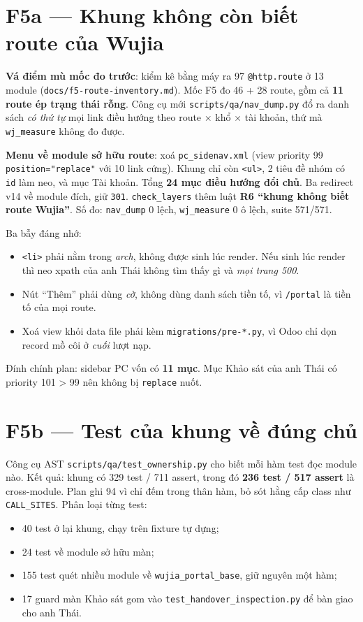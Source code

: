 \section{F5a --- Khung không còn biết route của Wujia}

\textbf{Vá điểm mù mốc đo trước}: kiểm kê bằng máy ra 97 \texttt{@http.route} ở 13 module
(\texttt{docs/f5-route-inventory.md}). Mốc F5 đo 46 + 28 route, gồm cả \textbf{11 route ép trạng thái rỗng}.
Công cụ mới \texttt{scripts/qa/nav\_dump.py} đổ ra danh sách \emph{có thứ tự} mọi link điều hướng theo
route × khổ × tài khoản, thứ mà \texttt{wj\_measure} không đo được.

\textbf{Menu về module sở hữu route}: xoá \texttt{pc\_sidenav.xml} (view priority 99 \texttt{position="replace"} với
10 link cứng). Khung chỉ còn \texttt{<ul>}, 2 tiêu đề nhóm có \texttt{id} làm neo, và mục Tài khoản. Tổng
\textbf{24 mục điều hướng đổi chủ}. Ba redirect v14 về module đích, giữ \texttt{301}. \texttt{check\_layers} thêm
luật \textbf{R6 ``khung không biết route Wujia''}. Số đo: \texttt{nav\_dump} 0 lệch, \texttt{wj\_measure} 0 ô lệch,
suite 571/571.

Ba bẫy đáng nhớ:
\begin{itemize}[nosep]
\item \texttt{<li>} phải nằm trong \emph{arch}, không được sinh lúc render. Nếu sinh lúc render thì neo xpath của
  anh Thái không tìm thấy gì và \emph{mọi trang 500}.
\item Nút ``Thêm'' phải dùng \emph{cờ}, không dùng danh sách tiền tố, vì \texttt{/portal} là tiền tố của mọi route.
\item Xoá view khỏi data file phải kèm \texttt{migrations/pre-*.py}, vì Odoo chỉ dọn record mồ côi ở \emph{cuối}
  lượt nạp.
\end{itemize}
Đính chính plan: sidebar PC vốn có \textbf{11 mục}. Mục Khảo sát của anh Thái có priority 101 > 99 nên không
bị \texttt{replace} nuốt.

\section{F5b --- Test của khung về đúng chủ}

Công cụ AST \texttt{scripts/qa/test\_ownership.py} cho biết mỗi hàm test đọc module nào. Kết quả: khung có
329 test / 711 assert, trong đó \textbf{236 test / 517 assert} là cross-module. Plan ghi 94 vì chỉ đếm trong
thân hàm, bỏ sót hằng cấp class như \texttt{CALL\_SITES}. Phân loại từng test:
\begin{itemize}[nosep]
\item 40 test ở lại khung, chạy trên fixture tự dựng;
\item 24 test về module sở hữu màn;
\item 155 test quét nhiều module về \texttt{wujia\_portal\_base}, giữ nguyên một hàm;
\item 17 guard màn Khảo sát gom vào \texttt{test\_handover\_inspection.py} để bàn giao cho anh Thái.
\end{itemize}

